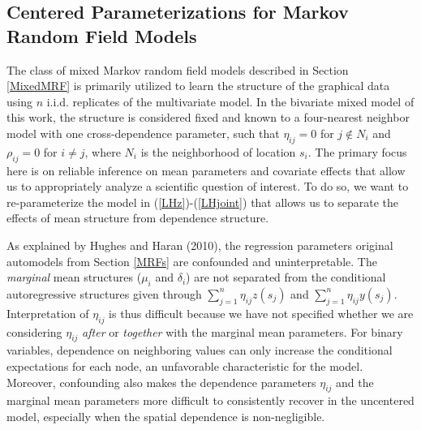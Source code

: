 \documentclass[12pt, a4paper, twoside]{article}
\begin{document}
\subsection{Centered Parameterizations for Markov Random Field Models} \label{Centered}
The class of mixed Markov random field models described in Section \ref{MixedMRF} is primarily utilized to learn the structure of the graphical data using $n$ i.i.d. replicates of the multivariate model. In the bivariate mixed model of this work, the structure is considered fixed and known to a four-nearest neighbor model with one cross-dependence parameter, such that $\eta_{ij} = 0$ for $j \notin N_i$ and $\rho_{ij}=0$ for $i\neq j$, where $N_i$ is the neighborhood of location $s_i$. The primary focus here is on reliable inference on mean parameters and covariate effects that allow us to appropriately analyze a scientific question of interest. To do so, we want to re-parameterize the model in (\ref{LHz})-(\ref{LHjoint}) that allows us to separate the effects of mean structure from dependence structure.

As explained by Hughes and Haran (2010), the regression parameters original automodels from Section \ref{MRFs} are confounded and uninterpretable. The \textit{marginal} mean structures ($\mu_i$ and $\delta_i$) are not separated from the {conditional} autoregressive structures given through $\sum_{j=1}^{n}\eta_{ij}z(s_j)$ and $\sum_{j=1}^{n}\eta_{ij}y(s_j)$. Interpretation of $\eta_{ij}$ is thus difficult because we have not specified whether we are considering $\eta_{ij}$ \textit{after} or \textit{together} with the marginal mean parameters. For binary variables, dependence on neighboring values can only increase the conditional expectations for each node, an unfavorable characteristic for the model. Moreover, confounding also makes the dependence parameters $\eta_{ij}$ and the marginal mean parameters more difficult to consistently recover in the uncentered model, especially when the spatial dependence is non-negligible.
\end{document}
